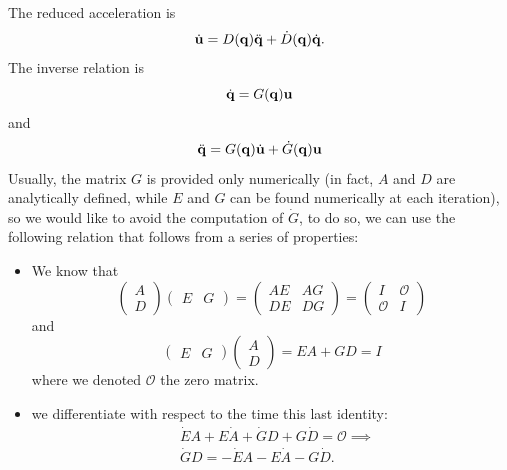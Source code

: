 \documentclass[10pt, a4paper]{report}
\newcommand{\q}{{\mathbf q}}
\begin{document}
The reduced acceleration is\begin{equation}
    \dot{\mathbf u }=D(\q)\ddq+\dot D(\q)\dq. 
\end{equation}
The inverse relation is\begin{equation}
    \dq=G(\q)\mathbf u 
\end{equation}
and\begin{equation}
    \ddq=G(\q) \dot{\mathbf u }+\dot G(\q)\mathbf u 
\end{equation}
Usually, the matrix $G$ is provided only numerically (in fact, $A$ and $D$ are analytically defined, while $E$ and $G$ can be found numerically at each iteration), so we would like to avoid the computation of $\dot G$, to do so, we can use the following relation that follows from a series of properties:\begin{itemize}
    \item We know that\begin{equation}
        \begin{pmatrix}
            A\\ D
        \end{pmatrix}\begin{pmatrix}
            E&G
        \end{pmatrix}=\begin{pmatrix}
            AE&AG\\ 
            DE&DG
        \end{pmatrix}=
        \begin{pmatrix}
            I&\mathcal O \\ 
           \mathcal O  &I
        \end{pmatrix}
    \end{equation}
    and \begin{equation}
         \begin{pmatrix}
            E&G
        \end{pmatrix}\begin{pmatrix}
            A\\ D
        \end{pmatrix}=EA+GD=I 
    \end{equation}
    where we denoted $\mathcal O$ the zero matrix.
    \item we differentiate with respect to the time this last identity:\begin{align}
        &\dot EA+E\dot A+\dot GD+G\dot D=\mathcal O\implies \\
        &\label{dotGD}\dot GD=-\dot EA-E\dot A-G\dot D.
    \end{align}
\end{itemize}
\end{document}
